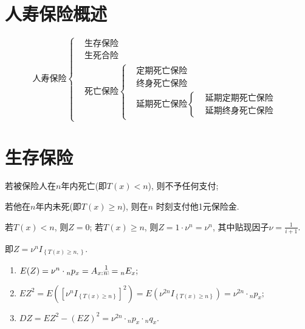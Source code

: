 \documentclass[lang=cn,10pt]{elegantbook}
\makeatletter
\DeclareRobustCommand{\annu}[1]{_{%
    \def\arraystretch{0}%
    \setlength\arraycolsep{1pt}%
    \setlength\arrayrulewidth{.2pt}%
    \begin{array}[b]{@{}c|}\hline
        \\[\arraycolsep]%
        \scriptstyle #1%
    \end{array}%
}}
\makeatother
\begin{document}
\section{人寿保险概述}
\begin{equation*}
    \text{人寿保险}
    \begin{cases}
         & \text{生存保险} \\
         & \text{生死合险} \\
         & \text{死亡保险}
        \begin{cases}
             & \text{定期死亡保险} \\
             & \text{终身死亡保险} \\
             & \text{延期死亡保险}
            \begin{cases}
                 & \text{延期定期死亡保险} \\
                 & \text{延期终身死亡保险}
            \end{cases}
        \end{cases}
    \end{cases}
\end{equation*}

\section{生存保险}
\begin{definition}[支付现值]
    若被保险人在$n$年内死亡(即$T(x)<n$), 则不予任何支付;

    若他在$n$年内未死(即$T(x)\geqslant n$), 则在$n$ 时刻支付他1元保险金.

    若$T(x)<n$, 则$Z=0$; 若$T(x)\geqslant n$, 则$Z=1\cdot \nu^n=\nu^n$, 其中贴现因子$\nu=\frac{1}{i+1}.$

    即$Z=\nu^nI_{\left\{ T\left( x \right) \geqslant n, \right\}}$.
\end{definition}

\begin{proposition}[精算现值与方差]
    \begin{enumerate}
        \item $E(Z)=\nu^n\cdot{}_np_x=A_{x:}\overset{1}{{}\annu{n}}={}_nE_x;$
        \item $E Z^2 =E\left( \left[ \nu^nI_{\left\{ T\left( x \right) \geqslant n \right\}} \right] ^2 \right) =E\left( \nu^{2n}I_{\left\{ T\left( x \right) \geqslant n \right\}} \right) =\nu^{2n}\cdot{}_np_x;$
        \item $DZ=EZ^2-\left( EZ \right) ^2=\nu^{2n}\cdot{}_np_x\cdot{}_nq_x.$
    \end{enumerate}
\end{proposition}
\end{document}
